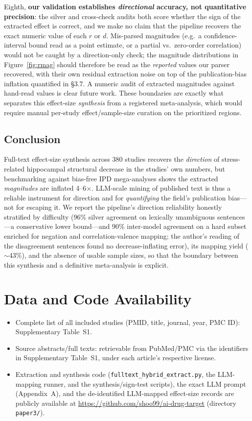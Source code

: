 \documentclass[11pt]{article}
\begin{document}
Eighth, \textbf{our validation establishes \emph{directional} accuracy, not
quantitative precision}: the silver and cross-check audits both score whether the
sign of the extracted effect is correct, and we make no claim that the pipeline
recovers the exact numeric value of each $r$ or $d$. Mis-parsed magnitudes
(e.g.\ a confidence-interval bound read as a point estimate, or a partial vs.\
zero-order correlation) would not be caught by a direction-only check; the
magnitude distributions in Figure~\ref{fig:rmag} should therefore be read as the
\emph{reported} values our parser recovered, with their own residual extraction
noise on top of the publication-bias inflation quantified in \S3.7. A numeric
audit of extracted magnitudes against hand-read values is clear future work.
These boundaries are exactly what separates this effect-size \emph{synthesis}
from a registered meta-analysis, which would require manual per-study
effect/sample-size curation on the prioritized regions.

\subsection{Conclusion}
Full-text effect-size synthesis across 380 studies recovers the \emph{direction}
of stress-related hippocampal structural decrease in the studies' own numbers,
but benchmarking against bias-free IPD mega-analyses shows the extracted
\emph{magnitudes} are inflated 4--6$\times$. LLM-scale mining of published text is
thus a reliable instrument for direction and for \emph{quantifying} the field's
publication bias---not for escaping it. We report the pipeline's direction
reliability honestly stratified by difficulty (96\% silver agreement on lexically
unambiguous sentences---a conservative lower bound---and 90\% inter-model
agreement on a hard subset enriched for negation and correlation-valence mapping;
the author's reading of the disagreement sentences found no decrease-inflating
error), its mapping yield ($\sim$43\%), and
the absence of usable sample sizes, so that the boundary between this synthesis
and a definitive meta-analysis is explicit.

\section*{Data and Code Availability}
\begin{itemize}
\item Complete list of all included studies (PMID, title, journal, year, PMC
ID): Supplementary Table~S1.
\item Source abstracts/full texts: retrievable from PubMed/PMC via the
identifiers in Supplementary Table~S1, under each article's respective license.
\item Extraction and synthesis code (\texttt{fulltext\_hybrid\_extract.py}, the
LLM-mapping runner, and the synthesis/sign-test scripts), the exact LLM prompt
(Appendix~A), and the de-identified LLM-mapped effect-size records are publicly
available at \url{https://github.com/shoo99/ai-drug-target} (directory
\texttt{paper3/}).
\end{itemize}
\end{document}
